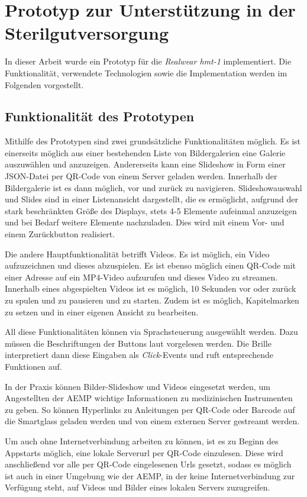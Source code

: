 %
%
%
%
%
%
\chapter{Prototyp zur Unterstützung in der Sterilgutversorgung}
\label{ch:Prototyp}
In dieser Arbeit wurde ein Prototyp für die \emph{Realwear hmt-1} implementiert. Die Funktionalität, verwendete Technologien sowie die Implementation werden im Folgenden vorgestellt.
%
%
\section{Funktionalität des Prototypen}
Mithilfe des Prototypen sind zwei grundsätzliche Funktionalitäten möglich. Es ist einerseits möglich aus einer bestehenden Liste von Bildergalerien eine Galerie auszuwählen und anzuzeigen. Andererseits kann eine Slideshow in Form einer JSON-Datei per QR-Code von einem Server geladen werden. Innerhalb der Bildergalerie ist es dann möglich, vor und zurück zu navigieren. Slideshowauswahl und Slides sind in einer Listenansicht dargestellt, die es ermöglicht, aufgrund der stark beschränkten Größe des Displays, stets 4-5 Elemente aufeinmal anzuzeigen und bei Bedarf weitere Elemente nachzuladen. Dies wird mit einem Vor- und einem Zurückbutton realisiert.

Die andere Hauptfunktionalität betrifft Videos. Es ist möglich, ein Video aufzuzeichnen und dieses abzuspielen. Es ist ebenso möglich einen QR-Code mit einer Adresse auf ein MP4-Video aufzurufen und dieses Video zu streamen. Innerhalb eines abgespielten Videos ist es möglich, 10 Sekunden vor oder zurück zu spulen und zu pausieren und zu starten. Zudem ist es möglich, Kapitelmarken zu setzen und in einer eigenen Ansicht zu bearbeiten.

All diese Funktionalitäten können via Sprachsteuerung ausgewählt werden. Dazu müssen die Beschriftungen der Buttons laut vorgelesen werden. Die Brille interpretiert dann diese Eingaben als \emph{Click}-Events und ruft entsprechende Funktionen auf.

In der Praxis können Bilder-Slideshow und Videos eingesetzt werden, um Angestellten der AEMP wichtige Informationen zu medizinischen Instrumenten zu geben. So können Hyperlinks zu Anleitungen per QR-Code oder Barcode auf die Smartglass geladen werden und von einem externen Server gestreamt werden.

Um auch ohne Internetverbindung arbeiten zu können, ist es zu Beginn des Appstarts möglich, eine lokale Serverurl per QR-Code einzulesen. Diese wird anschließend vor alle per QR-Code eingelesenen Urls gesetzt, sodass es möglich ist auch in einer Umgebung wie der AEMP, in der keine Internetverbindung zur Verfügung steht, auf Videos und Bilder eines lokalen Servers zuzugreifen. 

